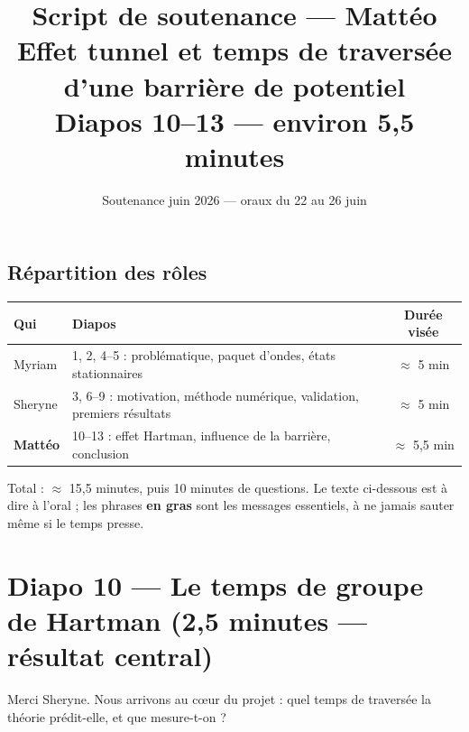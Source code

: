\documentclass[11pt,a4paper]{article}
\title{\textbf{Script de soutenance --- Mattéo}\\
	\large Effet tunnel et temps de traversée d'une barrière de potentiel\\
	\normalsize Diapos 10--13 --- environ 5,5 minutes}
\author{}
\date{Soutenance juin 2026 --- oraux du 22 au 26 juin}
\newcommand{\diapo}[2]{\section*{Diapo #1 --- #2}}
\begin{document}
	\maketitle
	
	\subsection*{Répartition des rôles}
	
	\begin{center}
		\begin{tabular}{llc}
			\toprule
			Qui & Diapos & Durée visée \\
			\midrule
			Myriam & 1, 2, 4--5 : problématique, paquet d'ondes, états stationnaires & $\approx$ 5 min \\
			Sheryne & 3, 6--9 : motivation, méthode numérique, validation, premiers résultats & $\approx$ 5 min \\
			\textbf{Mattéo} & 10--13 : effet Hartman, influence de la barrière, conclusion & $\approx$ 5,5 min \\
			\bottomrule
		\end{tabular}
	\end{center}
	
	
	Total : $\approx$ 15,5 minutes, puis 10 minutes de questions. Le texte ci-dessous
	est à dire à l'oral ; les phrases \textbf{en gras} sont les messages essentiels,
	à ne jamais sauter même si le temps presse.
	
	\diapo{10}{Le temps de groupe de Hartman (2,5 minutes --- résultat central)}
	
	Merci Sheryne. Nous arrivons au c\oe ur du projet : quel temps de traversée la
	théorie prédit-elle, et que mesure-t-on ?
	
\end{document}
